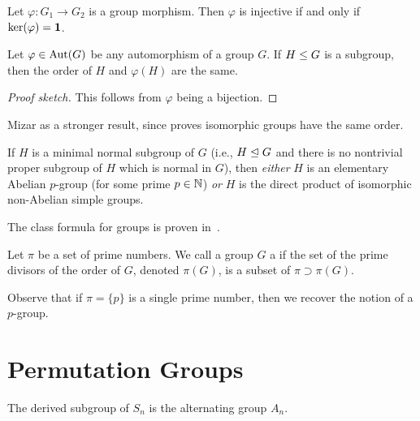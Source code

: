 \begin{theorem}
  Let $\varphi\colon G_{1}\to G_{2}$ is a group morphism.
  Then $\varphi$ is injective if and only if $\ker(\varphi)=\mathbf{1}$.
\end{theorem}


\begin{theorem}\label{thm:pure-math:iso-subgroups-have-same-order}
  Let $\varphi\in\operatorname{Aut}(G)$ be any automorphism of a group $G$.
  If $H\leq G$ is a subgroup, then the order of $H$ and
  $\varphi(H)$ are the same.
\end{theorem}

\begin{proof}[Proof sketch]
This follows from $\varphi$ being a bijection.
\end{proof}

\begin{thm-remark}
Mizar as a stronger result, since
\cite[Th73]{group6} proves isomorphic groups have the same order.
\end{thm-remark}

\begin{theorem}
  If $H$ is a minimal normal subgroup of $G$ (i.e., $H\trianglelefteq G$
  and there is no nontrivial proper subgroup of $H$ which is normal in
  $G$),
  then \emph{either} $H$ is an elementary Abelian $p$-group (for some
  prime $p\in\mathbb{N}$) \emph{or} $H$ is the direct product of isomorphic
  non-Abelian simple groups.
\end{theorem}

\begin{proposition}
The class formula for groups is proven in~.
\end{proposition}

\begin{definition}
Let $\pi$ be a set of prime numbers. We call a group $G$ a
 if the set of the prime divisors of the order of
$G$, denoted $\pi(G)$, is a subset of $\pi\supset\pi(G)$.
\end{definition}

Observe that if $\pi=\{p\}$ is a single prime number, then we recover
the notion of a $p$-group.


\section{Permutation Groups}

\begin{theorem}[Orre]
The derived subgroup of $S_{n}$ is the alternating group $A_{n}$.
\end{theorem}





